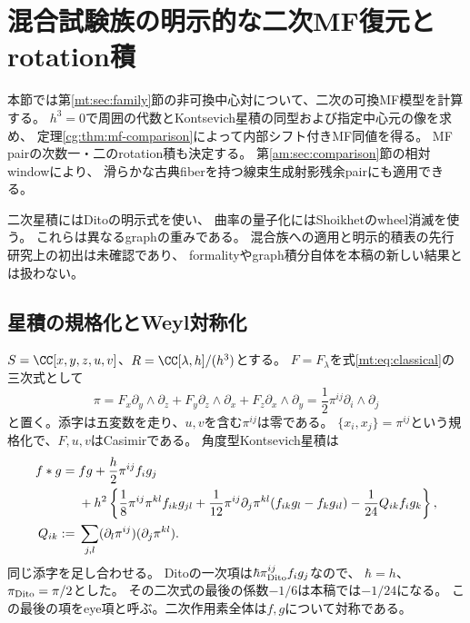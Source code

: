 \section{混合試験族の明示的な二次MF復元とrotation積}
\label{kj:sec:second-jet}

本節では第\ref{mt:sec:family}節の非可換中心対について、二次の可換MF模型を計算する。
$h^3=0$で周囲の代数とKontsevich星積の同型および指定中心元の像を求め、
定理\ref{cg:thm:mf-comparison}によって内部シフト付きMF同値を得る。
MF pairの次数一・二のrotation積も決定する。
第\ref{am:sec:comparison}節の相対windowにより、
滑らかな古典fiberを持つ線束生成射影残余pairにも適用できる。

二次星積にはDitoの明示式\cite[式~(3)、arXiv版の印刷頁5]{KJDito}を使い、
曲率の量子化にはShoikhetのwheel消滅\cite[Section~1.3]{KJShoikhet}を使う。
これらは異なるgraphの重みである。
混合族への適用と明示的積表の先行研究上の初出は未確認であり、
formalityやgraph積分自体を本稿の新しい結果とは扱わない。

\subsection{星積の規格化とWeyl対称化}

$S=\CC[x,y,z,u,v]$、$R=\CC[\lambda,h]/(h^3)$とする。
$F=F_\lambda$を式\eqref{mt:eq:classical}の三次式として
\begin{equation}\label{kj:eq:pi}
 \pi=F_x\partial_y\wedge\partial_z+
 F_y\partial_z\wedge\partial_x+F_z\partial_x\wedge\partial_y
 =\frac12\pi^{ij}\partial_i\wedge\partial_j
\end{equation}
と置く。添字は五変数を走り、$u,v$を含む$\pi^{ij}$は零である。
$\{x_i,x_j\}=\pi^{ij}$という規格化で、$F,u,v$はCasimirである。
角度型Kontsevich星積は
\begin{align}
 f*g={}&fg+\frac h2\pi^{ij}f_i g_j\notag\\
 &+h^2\left\{\frac18\pi^{ij}\pi^{kl}f_{ik}g_{jl}
 +\frac1{12}\pi^{ij}\partial_j\pi^{kl}(f_{ik}g_l-f_k g_{il})
 -\frac1{24}Q_{ik}f_i g_k\right\},\label{kj:eq:star}\\
 Q_{ik}:={}&\sum_{j,l}(\partial_l\pi^{ij})(\partial_j\pi^{kl}).
 \label{kj:eq:eye-tensor}
\end{align}
同じ添字を足し合わせる。
Ditoの一次項は$\hbar\pi_{\rm Dito}^{ij}f_i g_j$なので、
$\hbar=h$、$\pi_{\rm Dito}=\pi/2$とした。
その二次式の最後の係数$-1/6$は本稿では$-1/24$になる。
この最後の項をeye項と呼ぶ。二次作用素全体は$f,g$について対称である。

